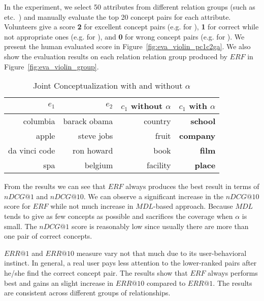 In the experiment, we select 50 attributes from different relation groups (such as  etc.\ ) and manually evaluate the top 20 concept pairs for each attribute.
Volunteers give a score \textbf{2} for excellent concept pairs (e.g.  for ), \textbf{1} for correct while not appropriate ones (e.g.  for  ), and \textbf{0} for wrong concept pairs (e.g.  for ).
We present the human evaluated score in Figure~\ref{fig:eva_violin_pc1c2ga}.
We also show the evaluation results on each relation relation group produced by $ERF$ in Figure~\ref{fig:eva_violin_group}.

\begin{table}[!hb]
  \vspace{-4mm}
  \centering
  \small
  \caption{Joint Conceptualization with and without $\alpha$}
    \begin{tabular}{rrrr}
    \toprule
    $e_1$                               & $e_2$                               & $c_1 $  without $\alpha$       & $c_1$  with $\alpha$ \\
    \midrule
    columbia                            & barack obama                        & country                    & \textbf{school }\\
    apple                               & steve jobs                          & fruit                & \textbf{company} \\
   da vinci code           & ron howard                       & book                     & \textbf{film} \\
    spa                                 & belgium                             & facility                  & \textbf{place} \\
    \bottomrule
    \end{tabular}%
  \label{tab:expjc}%
  \vspace{-2mm}
\end{table}%


From the results we can see that $ERF$ always produces the best result in terms of $nDCG@1$ and $nDCG@10$.
We can observe a significant increase in the $nDCG@10$ score for $ERF$ while not much increase in $MDL$-based approach. Because $MDL$ tends to give as few concepts as possible and sacrifices the coverage when $\alpha$ is small. The $nDCG@1$ score is reasonably low since usually there are more than one pair of correct concepts.

$ERR@1$ and $ERR@10$ measure vary not that much due to its user-behavioral instinct. In general, a real user pays less attention to the lower-ranked pairs after he/she find the correct concept pair.
The results show that 
 $ERF$ always performs best and gains an slight increase in $ERR@10$ compared to $ERR@1$.
 The results are consistent across different groups of relationships.



